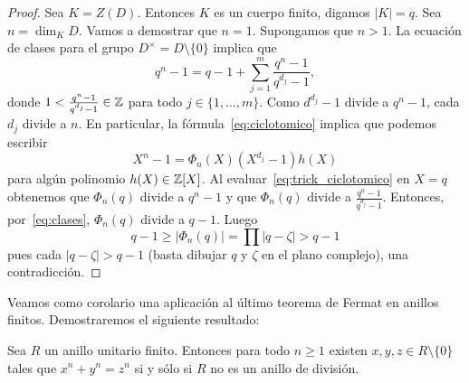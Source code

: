 \begin{proof}
	Sea $K=Z(D)$. Entonces $K$ es un cuerpo finito, digamos $|K|=q$. Sea
	$n=\dim_KD$.  Vamos a demostrar que $n=1$. Supongamos que $n>1$. 
	La ecuación de clases para el grupo $D^\times=D\setminus\{0\}$ implica que
	\begin{equation}
		\label{eq:clases}
		q^n-1=q-1+\sum_{j=1}^m \frac{q^n-1}{q^{d_j}-1},
	\end{equation}
	donde $1<\frac{q^n-1}{q^{d_j}-1}\in\mathbb{Z}$ para todo $j\in\{1,\dots,m\}$. 
	Como $d^{d_j}-1$ divide a $q^n-1$, cada $d_j$ divide a $n$. En particular,
	la fórmula~\eqref{eq:ciclotomico} implica que podemos escribir
	\begin{equation}
		\label{eq:trick_ciclotomico}
		X^n-1=\Phi_n(X)(X^{d_j}-1)h(X)
	\end{equation}
	para algún polinomio $h(X)\in\mathbb{Z}[X]$. 
	Al evaluar~\eqref{eq:trick_ciclotomico} en $X=q$  
	obtenemos que $\Phi_n(q)$ divide a $q^n-1$ y que $\Phi_n(q)$
	divide a $\frac{q^n-1}{q^{d_j}-1}$. Entonces, por~\eqref{eq:clases}, 
	$\Phi_n(q)$ divide a $q-1$. Luego 
	\[
		q-1\geq |\Phi_n(q)|=\prod |q-\zeta|>q-1
	\]
	pues cada $|q-\zeta|>q-1$ (basta dibujar $q$ y $\zeta$ en el plano
	complejo), una contradicción.
\end{proof}

Veamos como corolario una aplicación al último teorema de Fermat en anillos
finitos. Demostraremos el siguiente resultado:

\begin{theorem}
	Sea $R$ un anillo unitario finito. Entonces para todo $n\geq1$ existen $x,y,z\in
	R\setminus\{0\}$ tales que $x^n+y^n=z^n$ si y sólo si $R$ no es un anillo
	de división.
\end{theorem}

